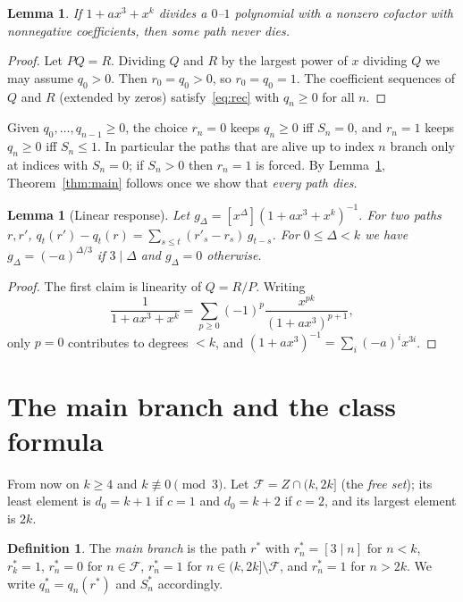 \documentclass[11pt]{amsart}
\newtheorem{lemma}[theorem]{Lemma}
\theoremstyle{definition}
\newtheorem{definition}[theorem]{Definition}
\theoremstyle{remark}
\newcommand{\F}{\mathcal{F}}
\begin{document}
\begin{lemma}\label{lem:reduce}
If $1+ax^3+x^k$ divides a $0$--$1$ polynomial with a nonzero cofactor with
nonnegative coefficients, then some path never dies.
\end{lemma}

\begin{proof}
Let $PQ=R$. Dividing $Q$ and $R$ by the largest power of $x$ dividing $Q$ we may
assume $q_0>0$. Then $r_0=q_0>0$, so $r_0=q_0=1$. The coefficient sequences of
$Q$ and $R$ (extended by zeros) satisfy~\eqref{eq:rec} with $q_n\ge 0$ for all $n$.
\end{proof}

Given $q_0,\dots,q_{n-1}\ge 0$, the choice $r_n=0$ keeps $q_n\ge 0$ iff $S_n=0$,
and $r_n=1$ keeps $q_n\ge 0$ iff $S_n\le 1$. In particular the paths that are
alive up to index $n$ branch only at indices with $S_n=0$; if $S_n>0$ then
$r_n=1$ is forced. By Lemma~\ref{lem:reduce}, Theorem~\ref{thm:main} follows once
we show that \emph{every path dies}.

\begin{lemma}[Linear response]\label{lem:resp}
Let $g_\Delta=[x^\Delta](1+ax^3+x^k)^{-1}$. For two paths $r,r'$,
$q_t(r')-q_t(r)=\sum_{s\le t}(r'_s-r_s)\,g_{t-s}$. For $0\le\Delta<k$ we have
$g_\Delta=(-a)^{\Delta/3}$ if $3\mid\Delta$ and $g_\Delta=0$ otherwise.
\end{lemma}

\begin{proof}
The first claim is linearity of $Q=R/P$. Writing
\begin{equation}\label{eq:pexp}
\frac{1}{1+ax^3+x^k}=\sum_{p\ge 0}(-1)^p\frac{x^{pk}}{(1+ax^3)^{p+1}},
\end{equation}
only $p=0$ contributes to degrees $<k$, and $(1+ax^3)^{-1}=\sum_i(-a)^ix^{3i}$.
\end{proof}

\section{The main branch and the class formula}\label{sec:main}

From now on $k\ge 4$ and $k\not\equiv 0\pmod 3$. Let $\F=Z\cap(k,2k]$ (the
\emph{free set}); its least element is $d_0=k+1$ if $c=1$ and $d_0=k+2$ if
$c=2$, and its largest element is $2k$.

\begin{definition}
The \emph{main branch} is the path $r^*$ with $r^*_n=[3\mid n]$ for $n<k$,
$r^*_k=1$, $r^*_n=0$ for $n\in\F$, $r^*_n=1$ for $n\in(k,2k]\setminus\F$, and
$r^*_n=1$ for $n>2k$. We write $q^*_n=q_n(r^*)$ and $S^*_n$ accordingly.
\end{definition}
\end{document}
